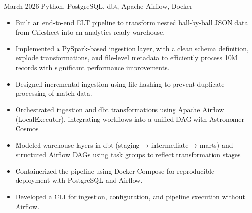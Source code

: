 

  {March 2026}
  {Python, PostgreSQL, dbt, Apache Airflow, Docker}
  \begin{itemize}
    \item Built an end-to-end ELT pipeline to transform nested ball-by-ball JSON data from Cricsheet into an analytics-ready warehouse.
    \item Implemented a PySpark-based ingestion layer, with a clean schema definition, explode transformations, and
      file-level metadata to efficiently process 10M records with significant performance improvements.
    \item Designed incremental ingestion using file hashing to prevent duplicate processing of match data.
    \item Orchestrated ingestion and dbt transformations using Apache Airflow (LocalExecutor), integrating workflows into a unified DAG with Astronomer Cosmos.
    \item Modeled warehouse layers in dbt (staging → intermediate → marts) and structured Airflow DAGs using task groups to reflect transformation stages
    \item Containerized the pipeline using Docker Compose for reproducible deployment with PostgreSQL and Airflow.
    \item Developed a CLI for ingestion, configuration, and pipeline execution without Airflow.

  \end{itemize}
